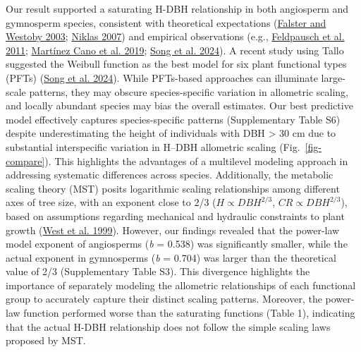 \documentclass[
  12pt,
  letterpaper,
  DIV=11,
  numbers=noendperiod]{scrartcl}
\begin{document}
Our result supported a saturating H-DBH relationship in both angiosperm
and gymnosperm species, consistent with theoretical expectations
(\protect\hyperlink{ref-Falster2003}{Falster and Westoby 2003};
\protect\hyperlink{ref-Niklas2007}{Niklas 2007}) and empirical
observations (e.g., \protect\hyperlink{ref-Feldpausch2011}{Feldpausch et
al. 2011}; \protect\hyperlink{ref-MartinezCano2019}{Martínez Cano et al.
2019}; \protect\hyperlink{ref-Song2024}{Song et al. 2024}). A recent
study using Tallo suggested the Weibull function as the best model for
six plant functional types (PFTs) (\protect\hyperlink{ref-Song2024}{Song
et al. 2024}). While PFTs-based approaches can illuminate large-scale
patterns, they may obscure species-specific variation in allometric
scaling, and locally abundant species may bias the overall estimates.
Our best predictive model effectively captures species-specific patterns
(Supplementary Table S6) despite underestimating the height of
individuals with DBH \textgreater{} 30 cm due to substantial
interspecific variation in H--DBH allometric scaling
(Fig.~\ref{fig-compare}). This highlights the advantages of a multilevel
modeling approach in addressing systematic differences across species.
Additionally, the metabolic scaling theory (MST) posits logarithmic
scaling relationships among different axes of tree size, with an
exponent close to 2/3 (\(H \propto DBH^{2/3}\),
\(CR \propto DBH^{2/3}\)), based on assumptions regarding mechanical and
hydraulic constraints to plant growth
(\protect\hyperlink{ref-West1999}{West et al. 1999}). However, our
findings revealed that the power-law model exponent of angiosperms
(\emph{b} = 0.538) was significantly smaller, while the actual exponent
in gymnosperms (\emph{b} = 0.704) was larger than the theoretical value
of 2/3 (Supplementary Table S3). This divergence highlights the
importance of separately modeling the allometric relationships of each
functional group to accurately capture their distinct scaling patterns.
Moreover, the power-law function performed worse than the saturating
functions (Table 1), indicating that the actual H-DBH relationship does
not follow the simple scaling laws proposed by MST.
\end{document}
